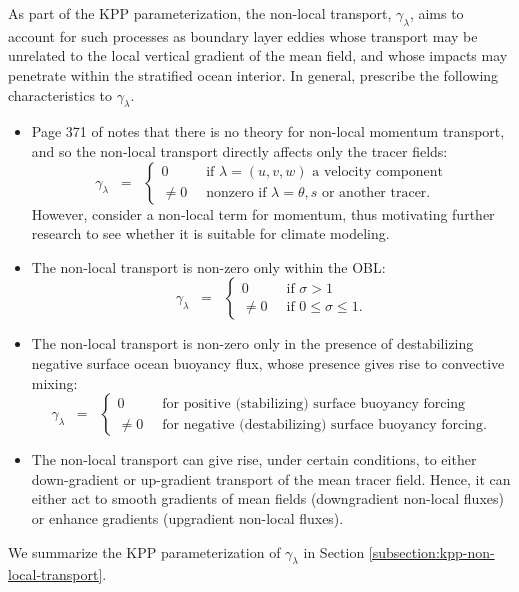 As part of the KPP parameterization, the non-local transport,
$\gamma_{\lambda}$, aims to account for such processes as boundary
layer eddies whose transport may be unrelated to the local vertical
gradient of the mean field, and whose impacts may penetrate within the
stratified ocean interior. In general, \cite{LargeKPP} prescribe the
following characteristics to $\gamma_{\lambda}$.
\begin{itemize}

\item Page 371 of \citep{LargeKPP} notes that there is no theory for
  non-local momentum transport, and so the non-local transport
  directly affects only the tracer fields:
\begin{equation}
 \gamma_{\lambda} \; \; = \; \; 
\left\{
 \begin{array}{ll}
  0 \; \;  &\mbox{if $\lambda = (u,v,w)$ a velocity component}
 \\
  \ne 0 \; \; &\mbox{nonzero if $\lambda = \theta,s$ or another tracer.}
  \end{array}
 \right.
\end{equation}
However, \cite{Smyth_etal2002} consider a non-local term for momentum,
thus motivating further research to see whether it is suitable for
climate modeling.  

  \item The non-local transport is non-zero only within the OBL:  
\begin{equation}
 \gamma_{\lambda} \; \; = \; \; 
  \left\{ 
  \begin{array}{ll}
   0 \; \; &\mbox{if $\sigma > 1$}
   \\ 
   \ne 0  \; \; &\mbox{if $0 \le \sigma \le 1$.}
  \end{array}
 \right.
\end{equation}

  \item The non-local transport is non-zero only in the presence of
    destabilizing negative surface ocean buoyancy flux, whose presence
    gives rise to convective mixing:
\begin{equation}
 \gamma_{\lambda} \; \; = \; \; 
  \left\{ 
  \begin{array}{ll}
   0 \; \; &\mbox{for positive (stabilizing) surface buoyancy forcing}
   \\ 
   \ne 0  \; \; &\mbox{for negative (destabilizing) surface buoyancy forcing.}
  \end{array}
 \right.
\end{equation}

  \item The non-local transport can give rise, under
    certain conditions, to either down-gradient or up-gradient
    transport of the mean tracer field. Hence, it can either act to
    smooth gradients of mean fields (downgradient non-local fluxes) or
    enhance gradients (upgradient non-local fluxes).

\end{itemize}
We summarize the KPP parameterization of $\gamma_{\lambda}$ in Section
\ref{subsection:kpp-non-local-transport}.



